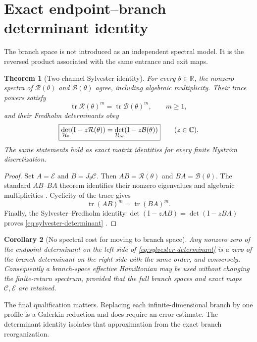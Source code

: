 \documentclass[11pt]{article}
\newtheorem{theorem}{Theorem}[section]
\newtheorem{corollary}[theorem]{Corollary}
\theoremstyle{definition}
\theoremstyle{remark}
\newcommand{\R}{\mathbb R}
\newcommand{\C}{\mathbb C}
\newcommand{\Id}{\mathrm I}
\newcommand{\cR}{\mathcal R}
\newcommand{\cB}{\mathcal B}
\newcommand{\cC}{\mathcal C}
\newcommand{\cE}{\mathcal E}
\newcommand{\cH}{\mathcal H}
\begin{document}
\section{Exact endpoint--branch determinant identity}
\label{sec:factorization}

The branch space is not introduced as an independent spectral model.  It is
the reversed product associated with the same entrance and exit maps.

\begin{theorem}[Two-channel Sylvester identity]
\label{thm:sylvester}
For every $\theta\in\R$, the nonzero spectra of $\cR(\theta)$ and
$\cB(\theta)$ agree, including algebraic multiplicity.  Their trace powers
satisfy
\begin{equation}\label{eq:trace-power-equality}
 \operatorname{tr}\cR(\theta)^m
 =\operatorname{tr}\cB(\theta)^m,
 \qquad m\ge1,
\end{equation}
and their Fredholm determinants obey
\begin{equation}\label{eq:sylvester-determinant}
 \boxed{
 \det_{\cH_0}(\Id-z\cR(\theta))
 =\det_{\cH_{\rm br}}(\Id-z\cB(\theta))}
 \qquad(z\in\C).
\end{equation}
The same statements hold as exact matrix identities for every finite
Nystr\"om discretization.
\end{theorem}

\begin{proof}
Set $A=\cE$ and $B=J_\theta\cC$.  Then
$AB=\cR(\theta)$ and $BA=\cB(\theta)$.  The standard $AB$--$BA$ theorem
identifies their nonzero eigenvalues and algebraic multiplicities
\citep{Kato1995}.  Cyclicity of the trace gives
\[
 \operatorname{tr}(AB)^m
 =\operatorname{tr}(BA)^m.
\]
Finally, the Sylvester--Fredholm identity
$\det(\Id-zAB)=\det(\Id-zBA)$ proves
\eqref{eq:sylvester-determinant} \citep{GohbergKrein1969,Simon2005}.
\end{proof}

\begin{corollary}[No spectral cost for moving to branch space]
\label{cor:no-cost}
Any nonzero zero of the endpoint determinant on the left side of
\eqref{eq:sylvester-determinant} is a zero of the branch determinant on the
right side with the same order, and conversely.  Consequently a branch-space
effective Hamiltonian may be used without changing the finite-return
spectrum, provided that the full branch spaces and exact maps $\cC,\cE$ are
retained.
\end{corollary}

The final qualification matters.  Replacing each infinite-dimensional
branch by one profile is a Galerkin reduction and does require an error
estimate.  The determinant identity isolates that approximation from the
exact branch reorganization.
\end{document}
